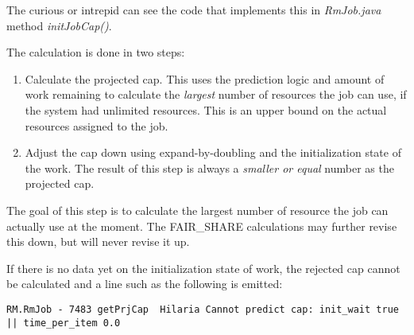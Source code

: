    The curious or intrepid can see the code that implements this in {\em RmJob.java} method 
   {\em initJobCap()}.

   The calculation is done in two steps:
   \begin{enumerate}
     \item Calculate the projected cap.  This uses the prediction logic and amount of
       work remaining to
       calculate the {\em largest} number of resources the job can use, if the system
       had unlimited resources.  This is an upper bound on the actual resources 
       assigned to the job.
     \item Adjust the cap down using expand-by-doubling and the initialization state of
       the work.  The result of this step is always a {\em smaller or equal} number
       as the projected cap.
   \end{enumerate}
   The goal of this step is to calculate the largest number of resource the job can
   actually use at the moment.  The FAIR\_SHARE calculations may further revise this
   down, but will never revise it up.

   If there is no data yet on the initialization state of work, the rejected cap cannot
   be calculated and a line such as the following is emitted:
\begin{verbatim}
RM.RmJob - 7483 getPrjCap  Hilaria Cannot predict cap: init_wait true || time_per_item 0.0
\end{verbatim}

